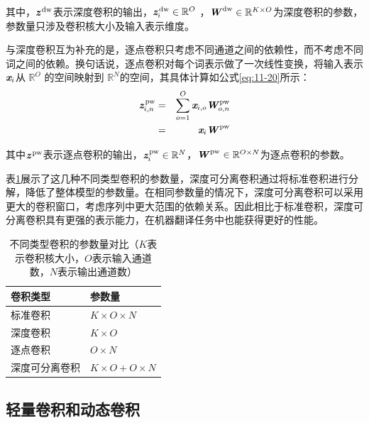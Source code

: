 \noindent 其中，$\textbf{\em z}^\textrm{\,dw}$表示深度卷积的输出，$\textbf{\em z}_i^\textrm{\,dw} \in \mathbb{R}^{O}$ ，$\textbf{\em W}^\textrm{\,dw} \in \mathbb{R}^{K \times O}$为深度卷积的参数，参数量只涉及卷积核大小及输入表示维度。

\parinterval 与深度卷积互为补充的是，逐点卷积只考虑不同通道之间的依赖性，而不考虑不同词之间的依赖。换句话说，逐点卷积对每个词表示做了一次线性变换，将输入表示$\textbf{\em x}_i$从 $\mathbb{R}^{O}$ 的空间映射到 $\mathbb{R}^{N}$的空间，其具体计算如公式\eqref{eq:11-20}所示：
\begin{eqnarray}
\textbf{\em z}_{i,n}^\textrm{\,pw} &=& \sum\limits_{o=1}^{O} \textbf{\em x}_{i,o} \textbf{\em W}_{o,n}^\textrm{\,pw} \nonumber \\
                      &=& \textbf{\em x}_i \textbf{\em W}^\textrm{\,pw}
\label{eq:11-20}
\end{eqnarray}

\noindent 其中$\textbf{\em z}^\textrm{\,pw}$表示逐点卷积的输出，$\textbf{\em z}_{i}^\textrm{\,pw} \in  \mathbb{R}^{N}$，$\textbf{\em W}^\textrm{\,pw} \in \mathbb{R}^{O \times N}$为逐点卷积的参数。

\parinterval 表\ref{tab:11-1}展示了这几种不同类型卷积的参数量，深度可分离卷积通过将标准卷积进行分解，降低了整体模型的参数量。在相同参数量的情况下，深度可分离卷积可以采用更大的卷积窗口，考虑序列中更大范围的依赖关系。因此相比于标准卷积，深度可分离卷积具有更强的表示能力，在机器翻译任务中也能获得更好的性能。

\begin{table}[htp]
\centering
\caption{不同类型卷积的参数量对比（$K$表示卷积核大小，$O$表示输入通道数，$N$表示输出通道数）}
\label{tab:11-1}
\begin{tabular}{l | l}
卷积类型 & 参数量 \\ \hline
\rule{0pt}{12pt}标准卷积 & $K \times O \times N$ \\
深度卷积 & $K \times O$ \\
逐点卷积 & $O \times N$ \\
深度可分离卷积 & $K \times O + O \times N $
\end{tabular}
\end{table}


\subsection{轻量卷积和动态卷积}

